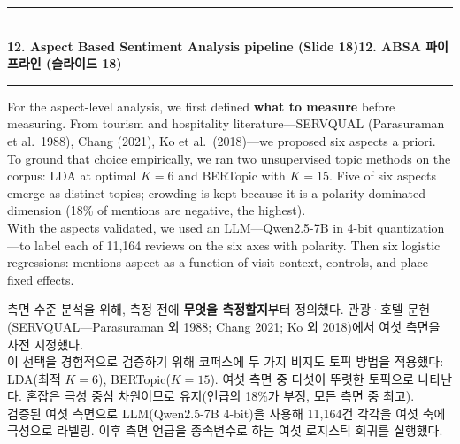 \documentclass[10pt,a4paper]{article}
\newcommand{\sechead}[2]{%
  \vspace{6pt}%
  \noindent\rule{\linewidth}{0.6pt}\\[1pt]
  {\small\bfseries #1\hfill #2}\\[-3pt]
  \rule{\linewidth}{0.4pt}\par\vspace{2pt}%
}
\newcommand{\sent}[1]{#1\\[5pt]}
\newcommand{\bilingual}[2]{%
  \noindent%
  \begin{minipage}[t]{0.485\linewidth}
    \small #1
  \end{minipage}\hfill\vrule\hfill%
  \begin{minipage}[t]{0.483\linewidth}
    \small #2
  \end{minipage}\par\vspace{4pt}%
}
\begin{document}
\sechead{12. Aspect Based Sentiment Analysis pipeline (Slide 18)}{12. ABSA 파이프라인 (슬라이드 18)}
\bilingual{%
  \sent{For the aspect-level analysis, we first defined \textbf{what to measure} before measuring. From tourism and hospitality literature---SERVQUAL (Parasuraman et al.\ 1988), Chang (2021), Ko et al.\ (2018)---we proposed six aspects a priori.}
  \sent{To ground that choice empirically, we ran two unsupervised topic methods on the corpus: LDA at optimal $K = 6$ and BERTopic with $K = 15$. Five of six aspects emerge as distinct topics; crowding is kept because it is a polarity-dominated dimension (18\% of mentions are negative, the highest).}
  \sent{With the aspects validated, we used an LLM---Qwen2.5-7B in 4-bit quantization---to label each of 11,164 reviews on the six axes with polarity. Then six logistic regressions: mentions-aspect as a function of visit context, controls, and place fixed effects.}
}{%
  \sent{측면 수준 분석을 위해, 측정 전에 \textbf{무엇을 측정할지}부터 정의했다. 관광·호텔 문헌(SERVQUAL---Parasuraman 외 1988; Chang 2021; Ko 외 2018)에서 여섯 측면을 사전 지정했다.}
  \sent{이 선택을 경험적으로 검증하기 위해 코퍼스에 두 가지 비지도 토픽 방법을 적용했다: LDA(최적 $K = 6$), BERTopic($K = 15$). 여섯 측면 중 다섯이 뚜렷한 토픽으로 나타난다. 혼잡은 극성 중심 차원이므로 유지(언급의 18\%가 부정, 모든 측면 중 최고).}
  \sent{검증된 여섯 측면으로 LLM(Qwen2.5-7B 4-bit)을 사용해 11,164건 각각을 여섯 축에 극성으로 라벨링. 이후 측면 언급을 종속변수로 하는 여섯 로지스틱 회귀를 실행했다.}
}
\end{document}
